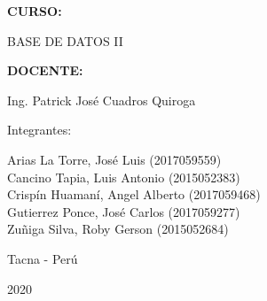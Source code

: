 \documentclass[12pt,letterpaper]{article}
\begin{document}
\begin{titlepage}
\begin{center}
\vspace*{0.2in}
\begin{Large}
\textbf{CURSO:} \\
\end{Large}

\vspace*{0.1in}
\begin{large}
BASE DE DATOS II\\
\end{large}

\vspace*{0.2in}
\begin{Large}
\textbf{DOCENTE:} \\
\end{Large}

\vspace*{0.1in}
\begin{large}
Ing. Patrick José Cuadros Quiroga\\
\end{large}

\vspace*{0.2in}
\vspace*{0.1in}
\begin{large}
Integrantes: \\
\begin{flushleft}
Arias La Torre, José Luis 			\hfill	(2017059559) \\
Cancino Tapia, Luis Antonio 		\hfill	(2015052383) \\
Crispín Huamaní, Angel Alberto      \hfill	(2017059468) \\
Gutierrez Ponce, José Carlos  		\hfill	(2017059277) \\
Zuñiga Silva, Roby Gerson       	\hfill	(2015052684) \\

\end{flushleft}
\end{large}
\vspace*{0.1in}
\begin{large}
Tacna - Perú\\
\end{large}
\vspace*{0.1in}
\begin{large}
2020\\
\end{large}

\end{center}

\end{titlepage}
\end{document}
